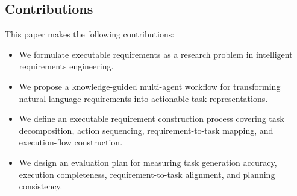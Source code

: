 \subsection{Contributions}
\label{sec:intro-contributions}

This paper makes the following contributions:
\begin{itemize}[leftmargin=*]
  \item We formulate executable requirements as a research problem in intelligent requirements engineering.
  \item We propose a knowledge-guided multi-agent workflow for transforming natural language requirements into actionable task representations.
  \item We define an executable requirement construction process covering task decomposition, action sequencing, requirement-to-task mapping, and execution-flow construction.
  \item We design an evaluation plan for measuring task generation accuracy, execution completeness, requirement-to-task alignment, and planning consistency.
\end{itemize}
